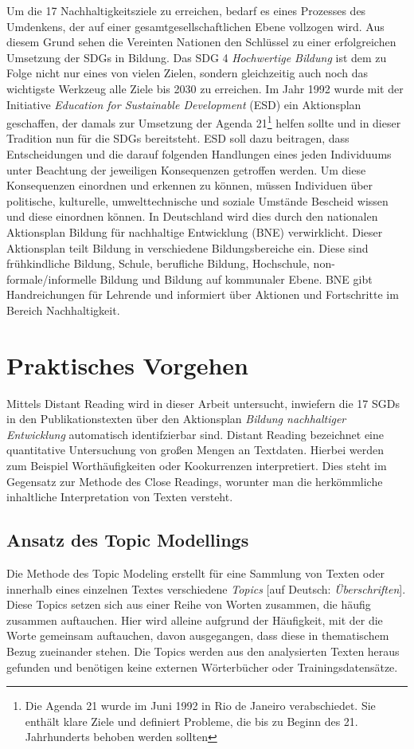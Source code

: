 \documentclass[letterpaper]{article}
\begin{document}
Um die 17 Nachhaltigkeitsziele zu erreichen, bedarf es eines Prozesses des Umdenkens, der auf einer gesamtgesellschaftlichen Ebene vollzogen wird. Aus diesem Grund sehen die Vereinten Nationen den Schlüssel zu einer erfolgreichen Umsetzung der SDGs in Bildung. Das SDG 4 \textit{Hochwertige Bildung} ist dem zu Folge nicht nur eines von vielen Zielen, sondern gleichzeitig auch noch das wichtigste Werkzeug alle Ziele bis 2030 zu erreichen\cite{ESD}.
Im Jahr 1992 wurde mit der Initiative \textit{Education for Sustainable Development} (ESD) ein Aktionsplan geschaffen, der damals zur Umsetzung der Agenda 21\footnote{Die Agenda 21 wurde im Juni 1992 in Rio de Janeiro verabschiedet. Sie enthält klare Ziele und definiert Probleme, die bis zu Beginn des 21. Jahrhunderts behoben werden sollten\cite{Agenda21}} helfen sollte und in dieser Tradition nun für die SDGs bereitsteht. ESD soll dazu beitragen, dass Entscheidungen und die darauf folgenden Handlungen eines jeden Individuums unter Beachtung der jeweiligen Konsequenzen getroffen werden. Um diese Konsequenzen einordnen und erkennen zu können, müssen Individuen über politische, kulturelle, umwelttechnische und soziale Umstände Bescheid wissen und diese einordnen können. In Deutschland wird dies durch den nationalen Aktionsplan Bildung für nachhaltige Entwicklung (BNE) verwirklicht. Dieser Aktionsplan teilt Bildung in verschiedene Bildungsbereiche ein. Diese sind frühkindliche Bildung, Schule, berufliche Bildung, Hochschule,  non-formale/informelle Bildung und Bildung auf kommunaler Ebene\cite{G}. BNE gibt Handreichungen für Lehrende und informiert über Aktionen und Fortschritte im Bereich Nachhaltigkeit.
 
\section{Praktisches Vorgehen}
Mittels Distant Reading wird in dieser Arbeit untersucht, inwiefern die 17 SGDs in den Publikationstexten über den Aktionsplan \textit{Bildung nachhaltiger Entwicklung} automatisch identifzierbar sind. Distant Reading bezeichnet eine quantitative Untersuchung von großen Mengen an Textdaten. Hierbei werden zum Beispiel Worthäufigkeiten oder Kookurrenzen interpretiert. Dies steht im Gegensatz zur Methode des Close Readings, worunter man die herkömmliche inhaltliche Interpretation von Texten versteht\cite{Moretti}.

\subsection{Ansatz des Topic Modellings}
Die Methode des Topic Modeling erstellt für eine Sammlung von Texten oder innerhalb eines einzelnen Textes verschiedene \textit{Topics} [auf Deutsch: \textit{Überschriften}]. Diese Topics setzen sich aus einer Reihe von Worten zusammen, die häufig zusammen auftauchen. Hier wird alleine aufgrund der Häufigkeit, mit der die Worte gemeinsam auftauchen, davon ausgegangen, dass diese in thematischem Bezug zueinander stehen. Die Topics werden aus den analysierten Texten heraus gefunden und benötigen keine externen Wörterbücher oder Trainingsdatensätze. 
\end{document}
